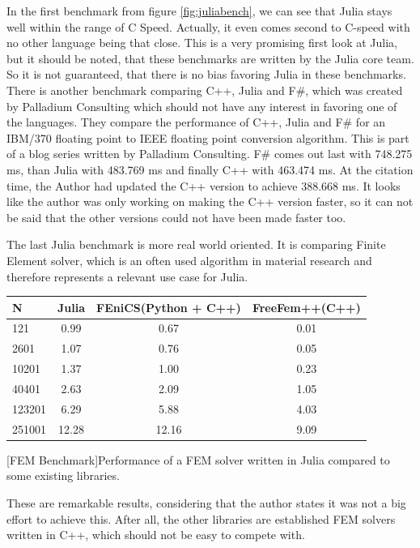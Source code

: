 In the first benchmark from figure \ref{fig:juliabench}, we can see that Julia stays well within the range of C Speed. 
Actually, it even comes second to C-speed with no other language being that close.
This is a very promising first look at Julia, but it should be noted, that these benchmarks are written by the Julia core team.
So it is not guaranteed, that there is no bias favoring Julia in these benchmarks.
There is another benchmark comparing C++, Julia and F\#, which was created by Palladium Consulting which should not have any interest in favoring one of the languages.
They compare the performance of C++, Julia and F\# for an IBM/370 floating point to IEEE floating point conversion algorithm. This is part of a blog series\cite{JuliaFSCpp} written by Palladium Consulting.
F\# comes out last with 748.275 ms, than Julia with 483.769 ms and finally C++ with 463.474 ms. 
At the citation time, the Author had updated the C++ version to achieve 388.668 ms. 
It looks like the author was only working on making the C++ version faster, so it can not be said that the other versions could not have been made faster too.

The last Julia benchmark is more real world oriented. 
It is comparing Finite Element solver, which is an often used algorithm in material research and therefore represents a relevant use case for Julia.

\begin{table}[htbp]
    \centering
    \begin{tabular}{l|c|c|c}
        \hline
        \textbf{N}  & \textbf{Julia} & \textbf{FEniCS(Python + C++)}  & \textbf{FreeFem++(C++)}\\
        \hline
        121         & 0.99           & 0.67             & 0.01 \\
        2601        & 1.07           & 0.76             & 0.05 \\
        10201       & 1.37           & 1.00             & 0.23 \\
        40401       & 2.63           & 2.09             & 1.05 \\
        123201      & 6.29           & 5.88             & 4.03 \\
        251001      & 12.28          & 12.16            & 9.09 \\
        \hline
    \end{tabular}
    [FEM Benchmark]{Performance of a FEM solver written in Julia compared to some existing libraries. \cite{FMSolver}}
    \label{table:fembench}
\end{table}
These are remarkable results, considering that the author states it was not a big effort to achieve this. After all, the other libraries are established FEM solvers written in C++, which should not be easy to compete with.

